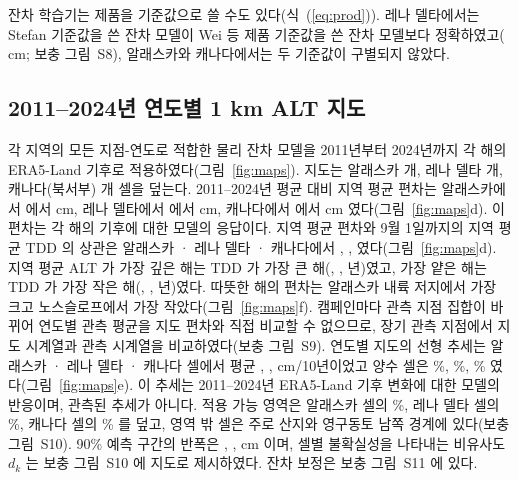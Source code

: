 
잔차 학습기는 제품을 기준값으로 쓸 수도 있다(식~(\ref{eq:prod})). 레나 델타에서는 Stefan 기준값을 쓴 잔차 모델이 Wei 등 제품 기준값을 쓴 잔차 모델보다 정확하였고(\npadLeRoRp{} cm; 보충 그림~S8), 알래스카와 캐나다에서는 두 기준값이 구별되지 않았다.

\subsection{2011--2024년 연도별 1 km ALT 지도}
각 지역의 모든 지점-연도로 적합한 물리 잔차 모델을 2011년부터 2024년까지 각 해의 ERA5-Land 기후로 적용하였다(그림~\ref{fig:maps}). 지도는 알래스카 \nncellmapAk{}개, 레나 델타 \nncellmapLe{}개, 캐나다(북서부) \nncellmapCa{}개 셀을 덮는다. 2011--2024년 평균 대비 지역 평균 편차는 알래스카에서 \nanminAk{} 에서 \nanmaxAk{} cm, 레나 델타에서 \nanminLe{} 에서 \nanmaxLe{} cm, 캐나다에서 \nanminCa{} 에서 \nanmaxCa{} cm 였다(그림~\ref{fig:maps}d). 이 편차는 각 해의 기후에 대한 모델의 응답이다. 지역 평균 편차와 9월 1일까지의 지역 평균 TDD 의 상관은 알래스카 · 레나 델타 · 캐나다에서 \ntddanomAk, \ntddanomLe, \ntddanomCa{} 였다(그림~\ref{fig:maps}d). 지역 평균 ALT 가 가장 깊은 해는 TDD 가 가장 큰 해(\ntddmaxAk, \ntddmaxLe, \ntddmaxCa{}년)였고, 가장 얕은 해는 TDD 가 가장 작은 해(\ntddminAk, \ntddminLe, \ntddminCa{}년)였다. 따뜻한 해의 편차는 알래스카 내륙 저지에서 가장 크고 노스슬로프에서 가장 작았다(그림~\ref{fig:maps}f). 캠페인마다 관측 지점 집합이 바뀌어 연도별 관측 평균을 지도 편차와 직접 비교할 수 없으므로, 장기 관측 지점에서 지도 시계열과 관측 시계열을 비교하였다(보충 그림~S9). 연도별 지도의 선형 추세는 알래스카 · 레나 델타 · 캐나다 셀에서 평균 \ntrendAk, \ntrendLe, \ntrendCa{} cm/10년이었고 양수 셀은 \ntrendposAk\%, \ntrendposLe\%, \ntrendposCa\% 였다(그림~\ref{fig:maps}e). 이 추세는 2011--2024년 ERA5-Land 기후 변화에 대한 모델의 반응이며, 관측된 추세가 아니다. 적용 가능 영역은 알래스카 셀의 \naoaAk\%, 레나 델타 셀의 \naoaLe\%, 캐나다 셀의 \naoaCa\% 를 덮고, 영역 밖 셀은 주로 산지와 영구동토 남쪽 경계에 있다(보충 그림~S10). 90\% 예측 구간의 반폭은 \nhwAk, \nhwLe, \nhwCa{} cm 이며, 셀별 불확실성을 나타내는 비유사도 $d_k$ 는 보충 그림~S10 에 지도로 제시하였다. 잔차 보정은 보충 그림~S11 에 있다.


